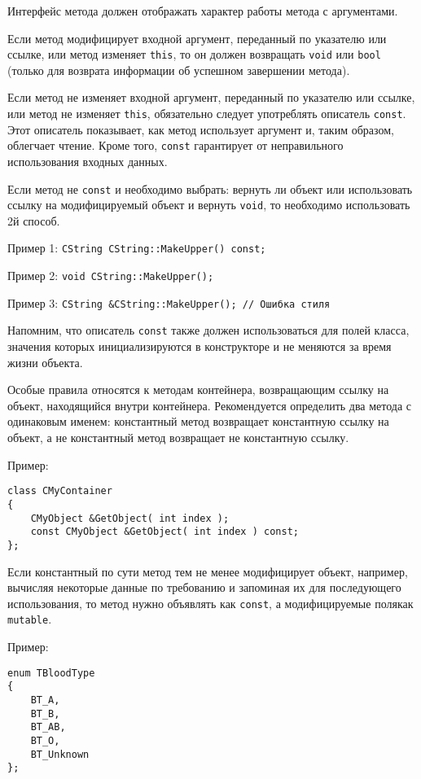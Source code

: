 {{{Интерфейс метода должен отображать характер работы метода с аргументами.

Если метод модифицирует входной аргумент, переданный по указателю или ссылке, или метод изменяет \lstinline|this|, то он должен возвращать \lstinline|void| или \lstinline|bool| (только для возврата информации об успешном завершении метода).

Если метод не изменяет входной аргумент, переданный по указателю или ссылке, или метод не изменяет \lstinline|this|, обязательно следует употреблять описатель \lstinline|const|. Этот описатель показывает, как метод использует аргумент и, таким образом, облегчает чтение. Кроме того, \lstinline|const| гарантирует от неправильного использования входных данных. 

Если метод не \lstinline|const| и необходимо выбрать: вернуть ли объект или использовать ссылку на модифицируемый объект и вернуть \lstinline|void|, то необходимо использовать 2\sdash й способ.

Пример 1: \lstinline|CString CString::MakeUpper() const;|

Пример 2: \lstinline|void CString::MakeUpper();|

Пример 3: \lstinline|CString &CString::MakeUpper(); // Ошибка стиля|

Напомним, что описатель \lstinline|const| также должен использоваться для полей класса, значения которых инициализируются в конструкторе и не меняются за время жизни объекта.

Особые правила относятся к методам контейнера, возвращающим ссылку на объект, находящийся внутри контейнера. Рекомендуется определить два метода с одинаковым именем: константный метод возвращает константную ссылку на объект, а не константный метод возвращает не константную ссылку.

Пример:

\begin{lstlisting}[frame=single]
class CMyContainer
{
    CMyObject &GetObject( int index );
    const CMyObject &GetObject( int index ) const;
};
\end{lstlisting}

Если константный по сути метод тем не менее модифицирует объект, например, вычисляя некоторые данные по требованию и запоминая их для последующего использования, то метод нужно объявлять как \lstinline|const|, а модифицируемые поля\mdash как \lstinline|mutable|.

Пример:

\begin{lstlisting}[frame=single]
enum TBloodType
{
    BT_A,
    BT_B,
    BT_AB,
    BT_O,
    BT_Unknown
};


\end{lstlisting}}}}
